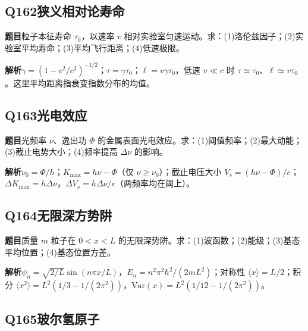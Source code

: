 \par\medskip

\subsection*{Q162\quad 狭义相对论寿命}

\textbf{题目}\quad 粒子本征寿命 $\tau_0$，以速率 $v$ 相对实验室匀速运动。求：(1)洛伦兹因子；(2)实验室平均寿命；(3)平均飞行距离；(4)低速极限。

\par\textbf{解析}\quad $\gamma=(1-v^2/c^2)^{-1/2}$；$\tau=\gamma\tau_0$；$\ell=v\gamma\tau_0$，低速 $v\ll c$ 时 $\tau\simeq\tau_0$、$\ell\simeq v\tau_0$。这里平均距离指衰变指数分布的均值。

\par\medskip

\subsection*{Q163\quad 光电效应}

\textbf{题目}\quad 光频率 $\nu$、逸出功 $\Phi$ 的金属表面光电效应。求：(1)阈值频率；(2)最大动能；(3)截止电势大小；(4)频率提高 $\Delta\nu$ 的影响。

\par\textbf{解析}\quad $\nu_0=\Phi/h$；$K_{\max}=h\nu-\Phi$（仅 $\nu\ge\nu_0$）；截止电压大小 $V_s=(h\nu-\Phi)/e$；$\Delta K_{\max}=h\Delta\nu$，$\Delta V_s=h\Delta\nu/e$（两频率均在阈上）。

\par\medskip

\subsection*{Q164\quad 无限深方势阱}

\textbf{题目}\quad 质量 $m$ 粒子在 $0<x<L$ 的无限深势阱。求：(1)波函数；(2)能级；(3)基态平均位置；(4)基态位置方差。

\par\textbf{解析}\quad $\psi_n=\sqrt{2/L}\sin(n\pi x/L)$，$E_n=n^2\pi^2\hbar^2/(2mL^2)$；对称性 $\langle x\rangle=L/2$；积分 $\langle x^2\rangle=L^2(1/3-1/(2\pi^2))$，$\mathrm{Var}(x)=L^2(1/12-1/(2\pi^2))$。

\par\medskip

\subsection*{Q165\quad 玻尔氢原子}

